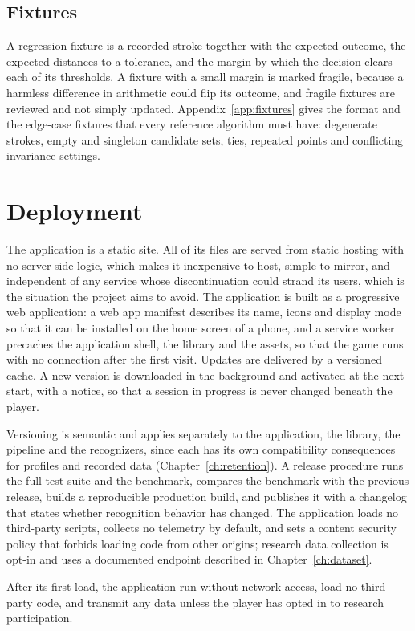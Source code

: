 \section{Fixtures}

A regression fixture is a recorded stroke together with the expected outcome, the expected distances to a tolerance, and the margin by which the decision clears each of its thresholds. A fixture with a small margin is marked fragile, because a harmless difference in arithmetic could flip its outcome, and fragile fixtures are reviewed and not simply updated. Appendix~\ref{app:fixtures} gives the format and the edge-case fixtures that every reference algorithm must have: degenerate strokes, empty and singleton candidate sets, ties, repeated points and conflicting invariance settings.

\chapter{Deployment}\label{ch:deployment}

The application is a static site. All of its files are served from static hosting with no server-side logic, which makes it inexpensive to host, simple to mirror, and independent of any service whose discontinuation could strand its users, which is the situation the project aims to avoid. The application is built as a progressive web application: a web app manifest describes its name, icons and display mode so that it can be installed on the home screen of a phone, and a service worker precaches the application shell, the library and the assets, so that the game runs with no connection after the first visit. Updates are delivered by a versioned cache. A new version is downloaded in the background and activated at the next start, with a notice, so that a session in progress is never changed beneath the player.

Versioning is semantic and applies separately to the application, the library, the pipeline and the recognizers, since each has its own compatibility consequences for profiles and recorded data (Chapter~\ref{ch:retention}). A release procedure runs the full test suite and the benchmark, compares the benchmark with the previous release, builds a reproducible production build, and publishes it with a changelog that states whether recognition behavior has changed. The application loads no third-party scripts, collects no telemetry by default, and sets a content security policy that forbids loading code from other origins; research data collection is opt-in and uses a documented endpoint described in Chapter~\ref{ch:dataset}.

\begin{requirement}\label{req:offline}
After its first load, the application \must{} run without network access, \must{} load no third-party code, and \mustnot{} transmit any data unless the player has opted in to research participation.\evS
\end{requirement}
